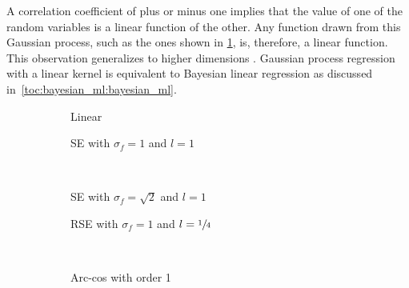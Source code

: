 A correlation coefficient of plus or minus one implies that the value of one of the random variables is a linear function of the other.
Any function drawn from this Gaussian process, such as the ones shown in \cref{fig:gp:gp_samples:linear}, is, therefore, a linear function.
This observation generalizes to higher dimensions \cite{rasmussen_gaussian_2006}.
Gaussian process regression with a linear kernel is equivalent to Bayesian linear regression as discussed in~\cref{toc:bayesian_ml:bayesian_ml}.
\begin{figure}[p]
    \begin{subfigure}[b]{\halffigurewidth}
        \centering
        \caption{
            Linear
            \label{fig:gp:gp_samples:linear}
        }
    \end{subfigure}
    \hfill
    \begin{subfigure}[b]{\halffigurewidth}
        \centering
        \caption{
            SE with $\sigma_f = 1$ and $l=1$
            \label{fig:gp:gp_samples:rbf_normal}
        }
    \end{subfigure}\\[\figureskip]
    \begin{subfigure}[b]{\halffigurewidth}
        \centering
        \caption{
            SE with $\sigma_f = \sqrt{2}$ and $l=1$
            \label{fig:gp:gp_samples:rbf_noisy}
        }
    \end{subfigure}
    \hfill
    \begin{subfigure}[b]{\halffigurewidth}
        \centering
        \caption{
            RSE with $\sigma_f = 1$ and $l = \sfrac{1}{4}$
            \label{fig:gp:gp_samples:rbf_lengthscale}
        }
    \end{subfigure}\\[\figureskip]
    \begin{subfigure}[b]{\halffigurewidth}
        \centering
        \caption{
            Arc-cos with order 1
            \label{fig:gp:gp_samples:arccos:1}
        }
    \end{subfigure}
    \hfill
    \begin{subfigure}[b]{\halffigurewidth}
        \centering
        \caption{
}
\end{subfigure}
\end{figure}
